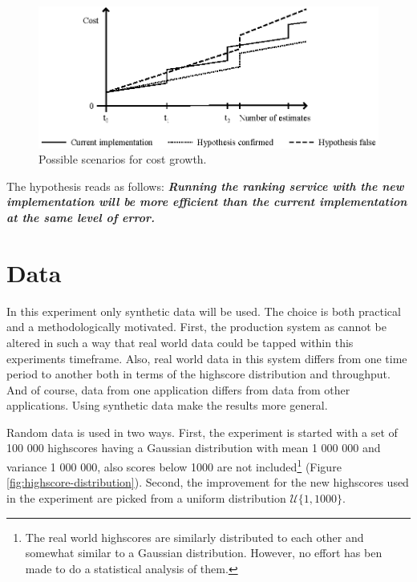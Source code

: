 \begin{figure}[h]
  \centering
  \caption{Possible scenarios for cost growth.}
  \label{fig:cost}
  \includegraphics[width=13cm]{img/hypothesis-cost1.eps}
\end{figure} 

The hypothesis reads as follows: \emph{\textbf{Running the ranking service with the new implementation will be more efficient than the current implementation at the same level of error.}}

\section{Data}

In this experiment only synthetic data will be used. The choice is both practical and a methodologically motivated. First, the production system as cannot be altered in such a way that real world data could be tapped within this experiments timeframe. Also, real world data in this system differs from one time period to another both in terms of the highscore distribution and throughput. And of course, data from one application differs from data from other applications. Using synthetic data make the results more general.

Random data is used in two ways. First, the experiment is started with a set of 100 000 highscores having a Gaussian distribution with mean 1 000 000 and variance 1 000 000, also scores below 1000 are not included\footnote{The real world highscores are similarly distributed to each other and somewhat similar to a Gaussian distribution. However, no effort has ben made to do a statistical analysis of them.} (Figure \ref{fig:highscore-distribution}). Second, the improvement for the new highscores used in the experiment are picked from a uniform distribution $\mathcal{U}\{1, 1000\}$.
 
